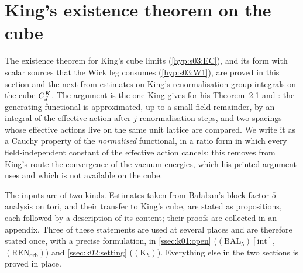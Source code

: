 \providecommand{\moving}[1]{\textcolor{orange!80!black}{[#1]}}
\providecommand{\Hrel}{\ensuremath{(\mathrm{H0rel})_{C}}}
\providecommand{\Kpos}{\ensuremath{(\mathrm{K}\text{-}\mathrm{pos})_{N}}}
\providecommand{\BALint}{\ensuremath{(\mathrm{BAL}_{5})[\mathrm{int}]}}
\providecommand{\RENorb}{\ensuremath{(\mathrm{REN}_{\mathrm{orb}})}}
\providecommand{\Kh}{\ensuremath{(\mathrm{K}_{h})}}
\providecommand{\Uplus}{\ensuremath{(\mathrm{U}^{+})}}
\providecommand{\Bh}{\ensuremath{(\mathrm{B}^{h})}}
\providecommand{\Rzero}{\ensuremath{(\mathrm{R}_{0})}}
\providecommand{\UBm}{\ensuremath{(\mathrm{UB}^{-})}}
\providecommand{\NEGinf}{\ensuremath{(\mathrm{NEG}_{\infty})}}
\providecommand{\Zk}{\ensuremath{Z_{k}}}
\providecommand{\Ik}[1]{\ensuremath{I^{(#1)}_{k}}}
\providecommand{\Ihat}[1]{\ensuremath{\hat I^{(#1)}_{k}}}
\providecommand{\Cl}{\operatorname{Cl}}

\section{King's existence theorem on the cube}\label{sec:k01}

The existence theorem for King's cube limits (\cref{hyp:s03:EC}), and its form with scalar sources that the Wick leg consumes (\cref{hyp:s03:W1}), are proved in this section and the next from estimates on King's renormalisation-group integrals on the cube $C^{K}_{J}$. The argument is the one King gives for his Theorem~2.1 \cite[Sect.~3.1]{K2} and \cite[Sect.~3.2]{K1}: the generating functional is approximated, up to a small-field remainder, by an integral of the effective action after $j$ renormalisation steps, and two spacings whose effective actions live on the same unit lattice are compared. We write it as a Cauchy property of the \emph{normalised} functional, in a ratio form in which every field-independent constant of the effective action cancels; this removes from King's route the convergence of the vacuum energies, which his printed argument uses and which is not available on the cube.

The inputs are of two kinds. Estimates taken from Ba{\l}aban's block-factor-$5$ analysis \cite{Ba1,Ba2,Ba3,Ba4} on tori, and their transfer to King's cube, are stated as propositions, each followed by a description of its content; their proofs are collected in an appendix. Three of these statements are used at several places and are therefore stated once, with a precise formulation, in \cref{ssec:k01:open} (\BALint, \RENorb) and \cref{ssec:k02:setting} (\Kh). Everything else in the two sections is proved in place.

